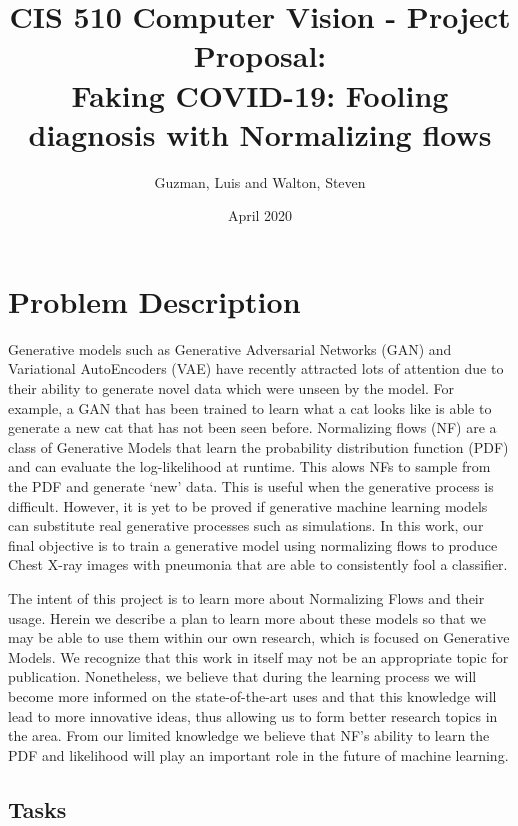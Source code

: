 \documentclass{article}
\title{CIS 510 Computer Vision - Project Proposal:\\
	Faking COVID-19: Fooling diagnosis with Normalizing flows}
\author{Guzman, Luis and Walton, Steven}
\date{April 2020}
\begin{document}
\maketitle

\section{Problem Description}
\label{intro}

Generative models such as Generative Adversarial Networks (GAN) and Variational
AutoEncoders (VAE) have recently attracted lots of attention due to  their
ability to generate novel data which were unseen by the model. For example, a
GAN that has been trained to learn what a cat looks like is able to generate a
new cat that has not been seen before\cite{tcdne}. Normalizing flows (NF) are
a class of Generative Models that learn the probability distribution function
(PDF) and can evaluate the log-likelihood at runtime. This alows NFs to sample
from the PDF and generate `new' data. This is useful when the generative
process is difficult. However, it is yet to be proved if generative machine
learning models can substitute real generative processes such as simulations.
In this work, our final objective is to train a generative model using
normalizing flows to produce Chest X-ray images with pneumonia that are able to
consistently fool a classifier.

The intent of this project is to learn more about Normalizing Flows and their
usage. Herein we describe a plan to learn more about these models so that we
may be able to use them within our own research, which is focused on Generative
Models. We recognize that this work in itself may not be an appropriate topic
for publication. Nonetheless, we believe that during the learning process we
will become more informed on the state-of-the-art uses and that this knowledge
will lead to more innovative ideas, thus allowing us to form better research
topics in the area. From our limited knowledge we believe that NF's ability to
learn the PDF and likelihood will play an important role in the future of
machine learning.

\subsection{Tasks}
\end{document}

